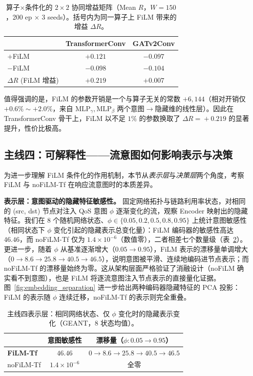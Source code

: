 \begin{table}[t]
\centering
\caption{算子$\times$条件化的 $2\times2$ 协同增益矩阵（Mean $R$，$W\!=\!150$，200 ep × 3 seeds）。括号内为同一算子上 FiLM 带来的增益 $\Delta R$。}
\label{tab:synergy_2x2}
\setlength{\tabcolsep}{6pt}
\begin{tabular}{lcc}
\toprule
 & TransformerConv & GATv2Conv \\
\midrule
$+$FiLM & $\mathbf{+0.121}$ & $-0.097$ \\
$-$FiLM & $-0.098$ & $-0.104$ \\
\midrule
$\Delta R$ (FiLM 增益) & $\mathbf{+0.219}$ & $+0.007$ \\
\bottomrule
\end{tabular}
\end{table}

值得强调的是，FiLM 的参数开销是一个与算子无关的常数 $+6{,}144$（相对开销仅 $+0.6\%\sim+2.0\%$，来自 $\mathrm{MLP}_\gamma,\mathrm{MLP}_\beta$ 两个意图$\to$隐藏维的线性层）。因此在 TransformerConv 骨干上，FiLM 以不足 $1\%$ 的参数换取了 $\Delta R\!=\!+0.219$ 的显著提升，性价比极高。


\subsection{主线四：可解释性——流意图如何影响表示与决策}
\label{sec:exp:interp}

为进一步理解 FiLM 条件化的作用机制，本节从\emph{表示层}与\emph{决策层}两个角度，考察 FiLM 与 noFiLM-Tf 在响应流意图时的本质差异。

\textbf{表示层：意图驱动的隐藏特征敏感性。} 固定网络拓扑与链路利用率状态，对相同的 (src, dst) 节点对注入 QoS 意图 $\phi$ 逐渐变化的流，观察 Encoder 映射出的隐藏特征。我们在 $8$ 个随机网络状态、$\phi\!\in\!\{0.05,0.2,0.5,0.8,0.95\}$ 上统计意图敏感性（相同状态下 $\phi$ 变化引起的隐藏表示总变化量）：FiLM 编码器的敏感性高达 $46.46$，而 noFiLM-Tf 仅为 $1.4\times10^{-6}$（数值零），二者相差七个数量级（表~\ref{tab:interp_repr}）。更进一步，随着 $\phi$ 从基准逐渐增大（$0.05\!\to\!0.95$），FiLM 表示的漂移量单调增大（$0\!\to\!8.6\!\to\!25.8\!\to\!40.5\!\to\!46.5$），说明意图被平滑、连续地编码进节点表示；而 noFiLM-Tf 的漂移量始终为零。这从架构层面严格验证了消融设计（noFiLM 确实看不到意图），也是 FiLM 将逐流意图注入节点表示的直接量化证据。图~\ref{fig:embedding_separation} 进一步给出两种编码器隐藏特征的 PCA 投影：FiLM 的表示随 $\phi$ 连续迁移，noFiLM-Tf 的表示则完全重叠。

\begin{table}[t]
\centering
\caption{主线四表示层：相同网络状态、仅 $\phi$ 变化时的隐藏表示变化（GEANT，$8$ 状态均值）。}
\label{tab:interp_repr}
\setlength{\tabcolsep}{5pt}
\begin{tabular}{lcc}
\toprule
 & 意图敏感性 & 漂移量（$\phi\!:0.05\!\to\!0.95$） \\
\midrule
\textbf{FiLM-Tf}  & $\mathbf{46.46}$ & $0\to8.6\to25.8\to40.5\to46.5$ \\
noFiLM-Tf         & $1.4\times10^{-6}$ & 全零 \\
\bottomrule
\end{tabular}
\end{table}

